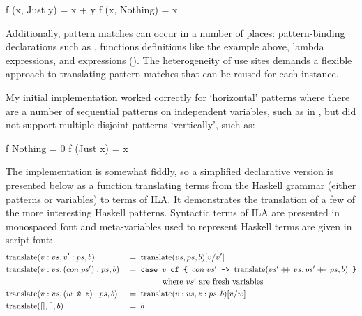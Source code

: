 \documentclass[dissertation.tex]{subfiles}
\begin{document}
{{{            \begin{haskellfigure}
            f (x, Just y) = x + y
            f (x, Nothing) = x
            \end{haskellfigure}

            Additionally, pattern matches can occur in a number of places: pattern-binding declarations such as , functions definitions like the example above, lambda expressions, and  expressions (). The heterogeneity of use sites demands a flexible approach to translating pattern matches that can be reused for each instance.

            My initial implementation worked correctly for `horizontal' patterns where there are a number of sequential patterns on independent variables, such as in , but did not support multiple disjoint patterns `vertically', such as:

            \begin{haskellfigure}
            f Nothing = 0
            f (Just x) = x
            \end{haskellfigure}

            The implementation is somewhat fiddly, so a simplified declarative version is presented below as a function translating terms from the Haskell grammar (either patterns or variables) to terms of ILA. It demonstrates the translation of a few of the more interesting Haskell patterns. Syntactic terms of ILA are presented in monospaced font and meta-variables used to represent Haskell terms are given in script font:
            \begin{alignat*}{2}
            \text{translate} & (v:vs, v':ps, b) && =\; \text{translate} (vs, ps, b) [v/v'] \\
            \text{translate} & (v:vs, (con\;ps'):ps, b) && =\; \texttt{case } v \texttt{ of \{ }con\;vs'\texttt{ -> }
            \text{translate} (vs' +\kern-1.3ex+\kern0.8ex vs, ps' +\kern-1.3ex+\kern0.8ex ps, b) \texttt{ \}} \\
            & && \hspace{1.5cm}\text{where } vs' \text{ are fresh variables} \\
            \text{translate} & (v:vs, (w \texttt{ @ } z):ps, b) && =\; \text{translate} (v:vs, z:ps, b) [v/w] \\
            \text{translate} & ([], [], b) && =\; b
            \end{alignat*}

}}}
\end{document}
